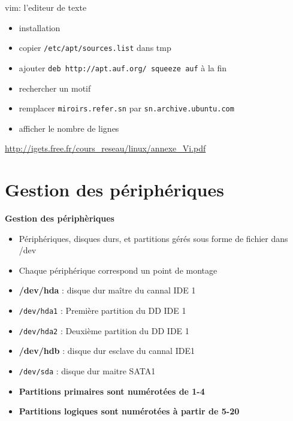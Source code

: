 \documentclass[french]{beamer}
\begin{document}
\begin{frame}
\begin{block}{vim: l'editeur de texte}
	\begin{itemize}
		\item installation
		\item copier \texttt{/etc/apt/sources.list} dans tmp
		\item ajouter \texttt{deb http://apt.auf.org/ squeeze auf} à la fin
		\item rechercher un motif
		\item remplacer \texttt{miroirs.refer.sn} par \texttt{sn.archive.ubuntu.com}
		\item afficher le nombre de lignes
	\end{itemize}
	\url{http://igets.free.fr/cours_reseau/linux/annexe_Vi.pdf}
\end{block}

\end{frame}


\section{Gestion des périphériques}
\frame{\tableofcontents[current]}

\begin{frame}
\begin{center}
\textbf{Gestion des périphèriques}
\end{center}
\begin{itemize}
\item Périphériques, disques durs, et partitions gérés sous forme de fichier dans /dev
\item Chaque périphérique correspond un point de montage
\item \textbf{/dev/hda} : disque dur maître du cannal IDE 1
\item \texttt{/dev/hda1} : Première partition du DD IDE 1
\item \texttt{/dev/hda2} : Deuxième partition du DD IDE 1
\item \textbf{/dev/hdb} : disque dur esclave du cannal IDE1
\item \texttt{/dev/sda} : disque dur maitre SATA1
\item \textbf{Partitions primaires sont numérotées de 1-4}
\item \textbf{Partitions logiques sont numérotées à partir de 5-20}
\end{itemize}
\end{frame}
\end{document}
